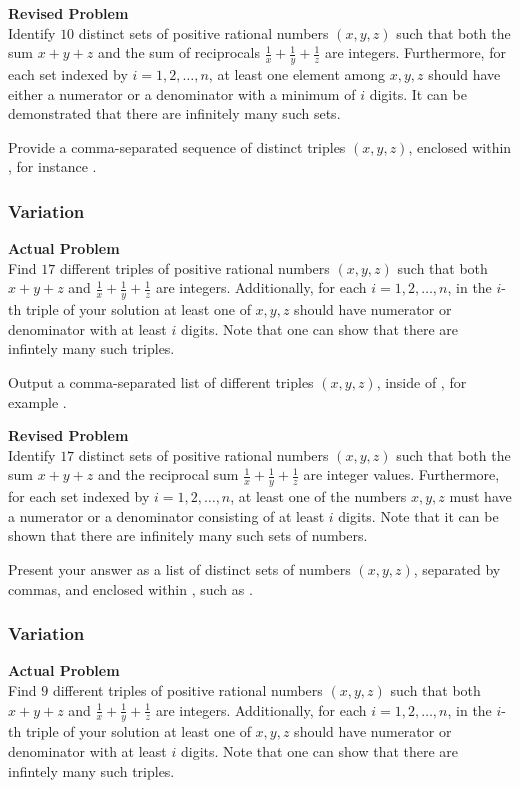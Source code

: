 \textbf{Revised Problem}\\
Identify $10$ distinct sets of positive rational numbers $(x, y, z)$ such that both the sum $x + y + z$ and the sum of reciprocals $\frac{1}{x} + \frac{1}{y} + \frac{1}{z}$ are integers. Furthermore, for each set indexed by $i = 1, 2, \ldots, n$, at least one element among $x, y, z$ should have either a numerator or a denominator with a minimum of $i$ digits. It can be demonstrated that there are infinitely many such sets.

Provide a comma-separated sequence of distinct triples $(x, y, z)$, enclosed within \boxed, for instance .

\subsubsection{Variation}
\textbf{Actual Problem}\\
Find $17$ different triples of positive rational numbers $(x, y, z)$ such that both $x + y + z$ and $\frac{1}{x} + \frac{1}{y} + \frac{1}{z}$ are integers.
Additionally, for each $i = 1, 2, \ldots, n$, in the $i$-th triple of your solution at least one of $x, y, z$ should have numerator or denominator with at least $i$ digits.
Note that one can show that there are infintely many such triples.


Output a comma-separated list of different triples $(x, y, z)$, inside of \boxed, for example .

\textbf{Revised Problem}\\
Identify $17$ distinct sets of positive rational numbers $(x, y, z)$ such that both the sum $x + y + z$ and the reciprocal sum $\frac{1}{x} + \frac{1}{y} + \frac{1}{z}$ are integer values. Furthermore, for each set indexed by $i = 1, 2, \ldots, n$, at least one of the numbers $x, y, z$ must have a numerator or a denominator consisting of at least $i$ digits. Note that it can be shown that there are infinitely many such sets of numbers.

Present your answer as a list of distinct sets of numbers $(x, y, z)$, separated by commas, and enclosed within \boxed, such as .

\subsubsection{Variation}
\textbf{Actual Problem}\\
Find $9$ different triples of positive rational numbers $(x, y, z)$ such that both $x + y + z$ and $\frac{1}{x} + \frac{1}{y} + \frac{1}{z}$ are integers.
Additionally, for each $i = 1, 2, \ldots, n$, in the $i$-th triple of your solution at least one of $x, y, z$ should have numerator or denominator with at least $i$ digits.
Note that one can show that there are infintely many such triples.


